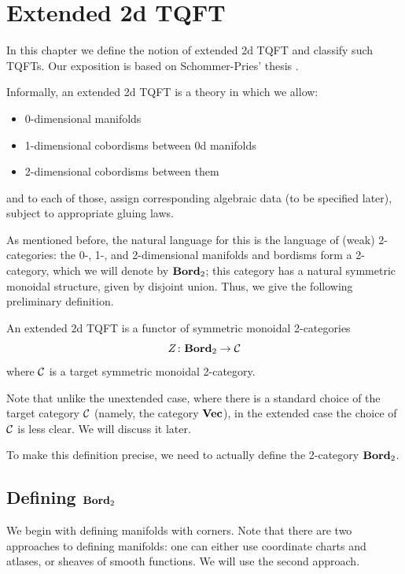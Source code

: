 \chapter{Extended 2d TQFT}\label{c:2d-extended}

In this chapter we define the notion of extended 2d TQFT and classify such
TQFTs. Our exposition is based on Schommer-Pries' thesis \cite{schommer-pries}.


Informally, an extended 2d TQFT is a theory in which we allow:
\begin{itemize}
  \item 0-dimensional manifolds
  \item 1-dimensional cobordisms between 0d manifolds
  \item 2-dimensional cobordisms between them
\end{itemize}
and to each of those, assign corresponding algebraic data (to be
specified later), subject to appropriate gluing laws.

As mentioned before, the natural language for this is the language of (weak)
2-categories: the 0-, 1-, and 2-dimensional manifolds and bordisms form a
2-category, which we will denote by $\mathbf{Bord}_2$; this category has a natural
symmetric monoidal structure, given by disjoint union. Thus, we give the
following preliminary definition.

\begin{predefinition}
  An extended 2d TQFT is a functor of symmetric monoidal 2-categories
  $$
    Z\colon \mathbf{Bord}_2\to \mathcal{C}
  $$
  where $\mathcal{C}$ is a target symmetric monoidal 2-category.
\end{predefinition}
Note that unlike the unextended case, where there is a standard choice of
the target category $\mathcal{C}$ (namely, the category $\mathbf{Vec}$), in the extended case
the choice of $\mathcal{C}$ is less clear. We will discuss it later.

To make this definition precise, we need to actually define the
2-category $\mathbf{Bord}_2$.

\section{Defining $\mathbf{Bord}_2$}\label{s:defining-bord2}
We begin with defining manifolds with corners. Note that there are two
approaches to defining manifolds: one can either use coordinate charts and
atlases, or sheaves of smooth functions. We will use the second approach.

